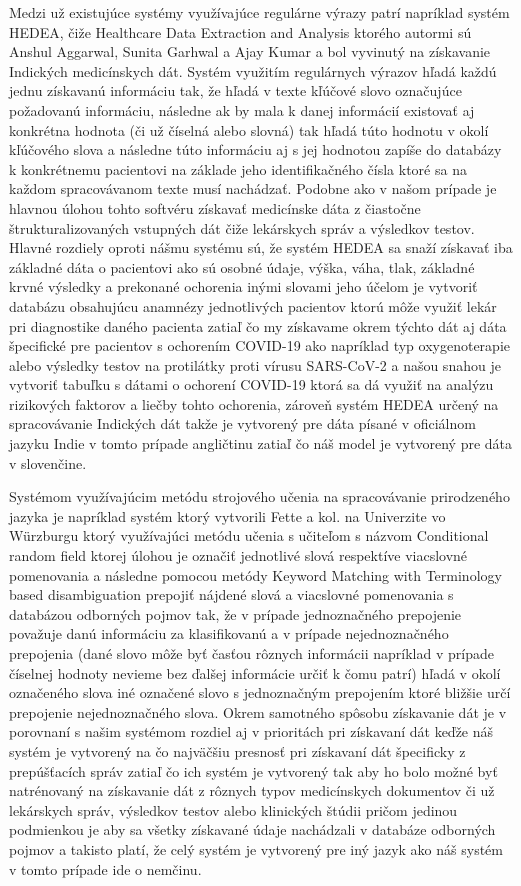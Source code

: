 Medzi už existujúce systémy využívajúce regulárne
výrazy patrí napríklad systém HEDEA, \cite{hedea} čiže 
Healthcare Data Extraction and Analysis ktorého
autormi sú Anshul Aggarwal, Sunita Garhwal a Ajay Kumar 
a bol vyvinutý na získavanie Indických medicínskych dát.
Systém využitím regulárnych výrazov hľadá každú jednu
získavanú informáciu tak, že hľadá v texte kľúčové slovo
označujúce požadovanú informáciu, následne ak by mala 
k danej informácií existovať aj konkrétna hodnota
(či už číselná alebo slovná) tak hľadá túto hodnotu v okolí
kľúčového slova a následne túto informáciu aj 
s jej hodnotou zapíše do databázy k konkrétnemu 
pacientovi na základe jeho identifikačného
čísla ktoré sa na každom spracovávanom texte musí nachádzať. 
Podobne ako v našom prípade je hlavnou úlohou tohto 
softvéru získavať medicínske dáta z čiastočne štrukturalizovaných
vstupných dát čiže lekárskych správ a výsledkov testov.
Hlavné rozdiely oproti nášmu systému sú, že systém HEDEA
sa snaží získavať iba základné dáta o pacientovi ako sú osobné
údaje, výška, váha, tlak, základné krvné výsledky a 
prekonané ochorenia inými slovami jeho účelom je vytvoriť
databázu obsahujúcu anamnézy jednotlivých pacientov
ktorú môže využiť lekár pri diagnostike daného pacienta
zatiaľ čo my získavame okrem týchto dát aj dáta 
špecifické pre pacientov s ochorením COVID-19 ako
napríklad typ oxygenoterapie alebo výsledky testov
na protilátky proti vírusu SARS-CoV-2 a našou snahou je 
vytvoriť tabuľku s dátami o ochorení COVID-19 ktorá
sa dá využiť na analýzu rizikových faktorov a liečby
tohto ochorenia, zároveň systém HEDEA určený na 
spracovávanie Indických dát
takže je vytvorený pre dáta písané v oficiálnom jazyku
Indie v tomto prípade angličtinu zatiaľ čo náš model
je vytvorený pre dáta v slovenčine.

Systémom využívajúcim metódu strojového učenia na
spracovávanie prirodzeného jazyka je napríklad 
systém ktorý vytvorili Fette a kol. na Univerzite
vo Würzburgu \cite{infExtGer} ktorý využívajúci metódu učenia s 
učiteľom s názvom Conditional random field ktorej úlohou
je označiť jednotlivé slová respektíve viacslovné
pomenovania \cite{CRF} a následne pomocou metódy 
Keyword Matching with Terminology based disambiguation
prepojiť nájdené slová a viacslovné pomenovania s databázou
odborných pojmov tak, že v prípade jednoznačného prepojenie 
považuje danú informáciu za klasifikovanú a v
prípade nejednoznačného prepojenia (dané slovo môže byť časťou
rôznych informácii napríklad v prípade číselnej hodnoty nevieme
bez ďalšej informácie určiť k čomu patrí) hľadá v okolí označeného 
slova iné označené slovo s jednoznačným prepojením ktoré bližšie 
určí prepojenie nejednoznačného slova. Okrem samotného spôsobu
získavanie dát je v porovnaní s našim systémom rozdiel 
aj v prioritách pri získavaní dát keďže náš systém 
je vytvorený na čo najväčšiu presnosť pri získavaní
dát špecificky z prepúšťacích správ zatiaľ čo ich 
systém je vytvorený tak aby ho bolo možné byť natrénovaný na 
získavanie dát z rôznych typov medicínskych dokumentov či už
lekárskych správ, výsledkov testov alebo klinických 
štúdii pričom jedinou podmienkou je aby sa všetky získavané údaje 
nachádzali v databáze odborných pojmov a takisto platí, 
že celý systém je vytvorený 
pre iný jazyk ako náš systém v tomto prípade ide o 
nemčinu. 

